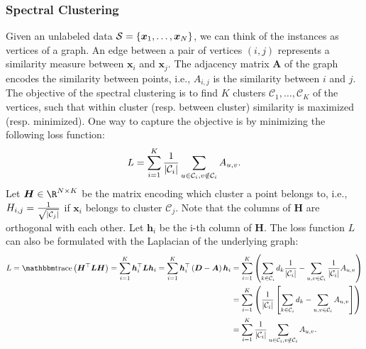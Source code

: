     \subsubsection{Spectral Clustering}
        Given an unlabeled data $\mathcal{S}=\{ \bm{x}_1, \ldots, \bm{x}_N \}$, we can think of the \ndata instances as \ndata vertices of a graph.
        An edge between a pair of vertices $(i, j)$ represents a similarity measure between $\bm{x}_i$ and $\bm{x}_j$.
        The adjacency matrix $\bm{A}$ of the graph encodes the similarity between points, i.e., $A_{i,j}$ is the similarity between $i$ and $j$.
        The objective of the spectral clustering is to find $K$ clusters $\mathcal{C}_1, \ldots, \mathcal{C}_K$ of the vertices, such that within cluster (resp. between cluster) similarity is maximized (resp. minimized).
        One way to capture the objective is by minimizing the following loss function:
            \begin{equation}
                L = \sum_{i=1}^{K}{\frac{1}{| \mathcal{C}_i |} \sum_{u \in \mathcal{C}_i, v \notin \mathcal{C}_i}^{}{A_{u, v}}}.
            \end{equation}
        Let $\bm{H} \in \R^{\ndata \times K}$ be the matrix encoding which cluster a point belongs to, i.e., $H_{i,j}=\frac{1}{\sqrt{| \mathcal{C}_j |}}$ if $\bm{x}_i$ belongs to cluster $\mathcal{C}_j$.
        Note that the columns of $\bm{H}$ are orthogonal with each other. 
        Let $\bm{h}_i$ be the i-th column of $\bm{H}$.
        The loss function $L$ can also be formulated with the Laplacian of the underlying graph:
            \begin{equation}
                \begin{aligned}
                    L  = \Tr\left( \bm{H}^\top \bm{L} \bm{H}  \right) = \sum_{i=1}^{K}{\bm{h}_i^\top \bm{L} \bm{h}_i} 
                      = \sum_{i=1}^{K}{\bm{h}_i^\top \left( \bm{D} - \bm{A} \right) \bm{h}_i} & = \sum_{i=1}^{K}{\left(   \sum_{k \in \mathcal{C}_i}^{}{d_k \frac{1}{\SetCard{\mathcal{C}_i}}} - \sum_{u, v \in \mathcal{C}_i}^{}{\frac{1}{\SetCard{\mathcal{C}_i}}A_{u, v}} 
                      \right)} \\
                      & =   \sum_{i=1}^{K}{\left( \frac{1}{\SetCard{\mathcal{C}_i}} \left[ \sum_{k \in \mathcal{C}_i}^{}{d_k} - \sum_{u, v \in \mathcal{C}_i}^{}{A_{u, v}} \right] \right)} \\
                      & = \sum_{i=1}^{K}{\frac{1}{\SetCard{\mathcal{C}_i}} \sum_{u \in \mathcal{C}_i, v\notin \mathcal{C}_i}^{}{A_{u,v}}}.
                \end{aligned}
            \end{equation}
